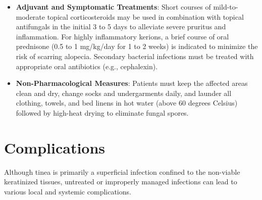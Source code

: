 \begin{itemize}
\begin{itemize}
        \item \textit{Griseofulvin (Oral)}: A fungistatic agent that disrupts the fungal mitotic spindle. It is primarily indicated for pediatric tinea capitis caused by Microsporum species, dosed at 20 to 25 mg/kg/day of microsize formulation for 6 to 12 weeks, and must be administered with fatty meals.
    \end{itemize}
    \item \textbf{Adjuvant and Symptomatic Treatments}: Short courses of mild-to-moderate topical corticosteroids may be used in combination with topical antifungals in the initial 3 to 5 days to alleviate severe pruritus and inflammation. For highly inflammatory kerions, a brief course of oral prednisone (0.5 to 1 mg/kg/day for 1 to 2 weeks) is indicated to minimize the risk of scarring alopecia. Secondary bacterial infections must be treated with appropriate oral antibiotics (e.g., cephalexin).
    \item \textbf{Non-Pharmacological Measures}: Patients must keep the affected areas clean and dry, change socks and undergarments daily, and launder all clothing, towels, and bed linens in hot water (above 60 degrees Celsius) followed by high-heat drying to eliminate fungal spores.
\end{itemize}

\section*{Complications}
Although tinea is primarily a superficial infection confined to the non-viable keratinized tissues, untreated or improperly managed infections can lead to various local and systemic complications.

